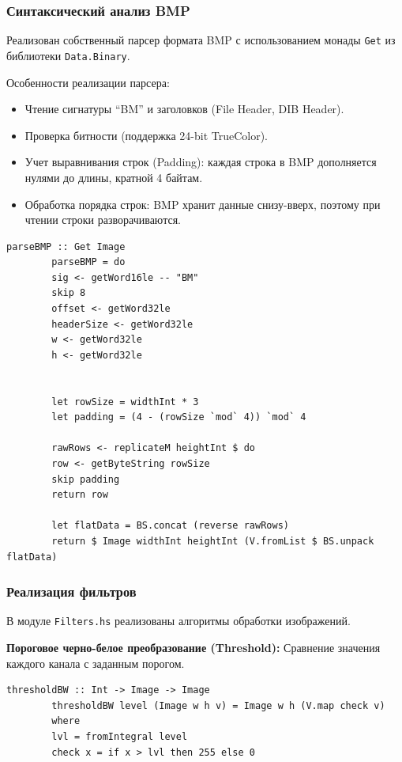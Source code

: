 \documentclass[a4paper, final]{article}
\begin{document}
	\subsubsection{Синтаксический анализ BMP}
	Реализован собственный парсер формата BMP с использованием монады \texttt{Get} из библиотеки \texttt{Data.Binary}.
	
	Особенности реализации парсера:
	\begin{itemize}
		\item Чтение сигнатуры ``BM'' и заголовков (File Header, DIB Header).
		\item Проверка битности (поддержка 24-bit TrueColor).
		\item Учет выравнивания строк (Padding): каждая строка в BMP дополняется нулями до длины, кратной 4 байтам.
		\item Обработка порядка строк: BMP хранит данные снизу-вверх, поэтому при чтении строки разворачиваются.
	\end{itemize}
	
	\begin{lstlisting}[caption={Фрагмент парсера BMP}, label={lst:bmp_parser}]
		parseBMP :: Get Image
		parseBMP = do
		sig <- getWord16le -- "BM"
		skip 8 
		offset <- getWord32le
		headerSize <- getWord32le
		w <- getWord32le
		h <- getWord32le

		
		let rowSize = widthInt * 3
		let padding = (4 - (rowSize `mod` 4)) `mod` 4
		
		rawRows <- replicateM heightInt $ do
		row <- getByteString rowSize
		skip padding 
		return row
		
		let flatData = BS.concat (reverse rawRows) 
		return $ Image widthInt heightInt (V.fromList $ BS.unpack flatData)
	\end{lstlisting}    
	
	\subsubsection{Реализация фильтров}
	В модуле \texttt{Filters.hs} реализованы алгоритмы обработки изображений.
	
	\textbf{Пороговое черно-белое преобразование (Threshold):}
	Сравнение значения каждого канала с заданным порогом.
	
	\begin{lstlisting}[caption={Реализация порогового преобразования}, label={lst:bw}]
		thresholdBW :: Int -> Image -> Image
		thresholdBW level (Image w h v) = Image w h (V.map check v)
		where
		lvl = fromIntegral level
		check x = if x > lvl then 255 else 0
	\end{lstlisting}
	
\end{document}
